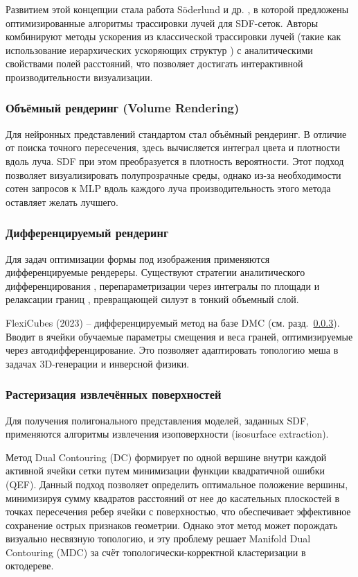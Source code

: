 Развитием этой концепции стала работа Söderlund и др. \cite{soderlund2022ray}, в которой предложены оптимизированные алгоритмы трассировки лучей \cite[с.~443]{RTR4} для SDF-сеток. Авторы комбинируют методы ускорения из классической трассировки лучей (такие как использование иерархических ускоряющих структур \cite[с.~818]{RTR4}) с аналитическими свойствами полей расстояний, что позволяет достигать интерактивной производительности визуализации.

\subsubsection{Объёмный рендеринг (Volume Rendering)} \label{sssec:vrender}
Для нейронных представлений \cite{wang2021neus}\cite{yariv2021volume} стандартом стал объёмный рендеринг. В отличие от поиска точного пересечения, здесь вычисляется интеграл цвета и плотности вдоль луча. SDF при этом преобразуется в плотность вероятности. Этот подход позволяет визуализировать полупрозрачные среды, однако из-за необходимости сотен запросов к MLP вдоль каждого луча производительность этого метода оставляет желать лучшего.

\subsubsection{Дифференцируемый рендеринг}
Для задач оптимизации формы под изображения применяются дифференцируемые рендереры. Существуют стратегии аналитического дифференцирования \cite{jiang2020sdfdiff}, перепараметризации через интегралы по площади \cite{vicini2022differentiable} и релаксации границ \cite{wang2024simple}, превращающей силуэт в тонкий объемный слой.

FlexiCubes \cite{shen2023flexicubes} (2023) -- дифференцируемый метод на базе DMC \cite{schaefer2004dmc} (см. разд.~\ref{sssec:rast}). Вводит в ячейки обучаемые параметры смещения и веса граней, оптимизируемые через автодифференцирование.
 Это позволяет адаптировать топологию меша в задачах 3D-генерации и инверсной физики.

\subsubsection{Растеризация извлечённых поверхностей} \label{sssec:rast}

Для получения полигонального представления моделей, заданных SDF, применяются алгоритмы извлечения изоповерхности (isosurface extraction).

Метод Dual Contouring (DC) \cite{ju2002dc} формирует по одной вершине внутри каждой активной ячейки сетки путем минимизации функции квадратичной ошибки (QEF). Данный подход позволяет определить оптимальное положение вершины, минимизируя сумму квадратов расстояний от нее до касательных плоскостей в точках пересечения ребер ячейки с поверхностью, что обеспечивает эффективное сохранение острых признаков геометрии.
Однако этот метод может порождать визуально несвязную топологию, и эту проблему решает Manifold Dual Contouring (MDC) \cite{schaefer2007manifold} за счёт топологически-корректной кластеризации в октодереве.

